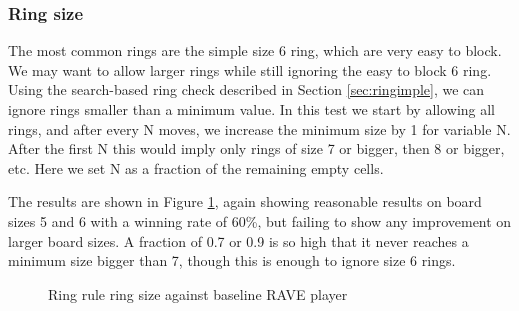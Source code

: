 \subsubsection{Ring size}

The most common rings are the simple size 6 ring, which are very easy to block. We may want to allow larger rings while still ignoring the easy to block 6 ring. Using the search-based ring check described in Section \ref{sec:ringimple}, we can ignore rings smaller than a minimum value. In this test we start by allowing all rings, and after every N moves, we increase the minimum size by 1 for variable N. After the first N this would imply only rings of size 7 or bigger, then 8 or bigger, etc. Here we set N as a fraction of the remaining empty cells.

The results are shown in Figure \ref{fig:ringsize}, again showing reasonable results on board sizes 5 and 6 with a winning rate of 60\%, but failing to show any improvement on larger board sizes. A fraction of 0.7 or 0.9 is so high that it never reaches a minimum size bigger than 7, though this is enough to ignore size 6 rings.


\begin{figure}
	\centering
{}
	\caption{Ring rule ring size against baseline RAVE player}
	\label{fig:ringsize}
\end{figure}



